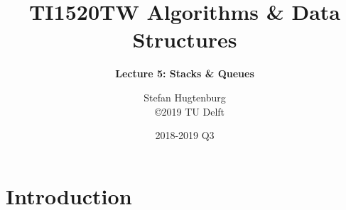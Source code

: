 

\title[Algorithms \& Data Structures]{TI1520TW Algorithms \& Data Structures}
\subtitle{\color{cyan} \textbf{Lecture 5: Stacks \& Queues}}
\author{Stefan Hugtenburg\\ {\tiny{\qquad~~\copyright 2019 TU Delft}}}
\date{2018-2019 Q3}



\frame{\titlepage}

\section{Introduction}













\frame{\titlepage}


